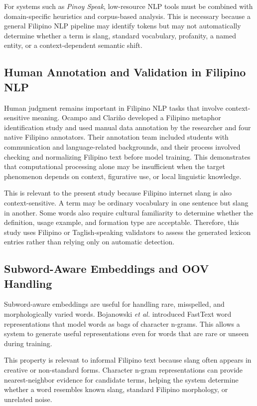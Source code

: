 For systems such as \textit{Pinoy Speak}, low-resource NLP tools must be combined with domain-specific heuristics and corpus-based analysis. This is necessary because a general Filipino NLP pipeline may identify tokens but may not automatically determine whether a term is slang, standard vocabulary, profanity, a named entity, or a context-dependent semantic shift.

\subsection{Human Annotation and Validation in Filipino NLP}
Human judgment remains important in Filipino NLP tasks that involve context-sensitive meaning. Ocampo and Clari\~no \cite{b12} developed a Filipino metaphor identification study and used manual data annotation by the researcher and four native Filipino annotators. Their annotation team included students with communication and language-related backgrounds, and their process involved checking and normalizing Filipino text before model training. This demonstrates that computational processing alone may be insufficient when the target phenomenon depends on context, figurative use, or local linguistic knowledge.

This is relevant to the present study because Filipino internet slang is also context-sensitive. A term may be ordinary vocabulary in one sentence but slang in another. Some words also require cultural familiarity to determine whether the definition, usage example, and formation type are acceptable. Therefore, this study uses Filipino or Taglish-speaking validators to assess the generated lexicon entries rather than relying only on automatic detection.

\subsection{Subword-Aware Embeddings and OOV Handling}
Subword-aware embeddings are useful for handling rare, misspelled, and morphologically varied words. Bojanowski \textit{et al.} \cite{b5} introduced FastText word representations that model words as bags of character n-grams. This allows a system to generate useful representations even for words that are rare or unseen during training.

This property is relevant to informal Filipino text because slang often appears in creative or non-standard forms. Character n-gram representations can provide nearest-neighbor evidence for candidate terms, helping the system determine whether a word resembles known slang, standard Filipino morphology, or unrelated noise.

